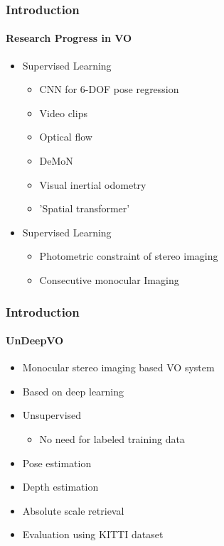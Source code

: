 \begin{frame}
    \frametitle{Introduction}
    \framesubtitle{Research Progress in VO}
    \begin{itemize}
    \item Supervised Learning
     \begin{itemize}
        \item CNN for 6-DOF pose regression
        \item Video clips
        \item Optical flow
        \item DeMoN
        \item Visual inertial odometry
        \item 'Spatial transformer'
        \end{itemize}
    \end{itemize}
    \begin{itemize} 
    \item Supervised Learning
     \begin{itemize}
        \item Photometric constraint of stereo imaging
        \item Consecutive monocular Imaging
        \end{itemize}
    \end{itemize}
\end{frame}

\begin{frame}
    \frametitle{Introduction}
    \framesubtitle{UnDeepVO}
    \begin{itemize}
        \item Monocular stereo imaging based VO system
        \item Based on deep learning
        \item Unsupervised
        \begin{itemize}
            \item No need for labeled training data
        \end{itemize}
        \item Pose estimation
        \item Depth estimation
        \item Absolute scale retrieval
        \item Evaluation using KITTI dataset
    \end{itemize}
\end{frame}
